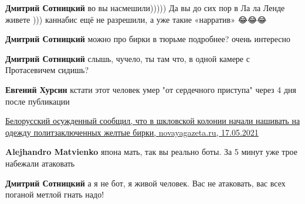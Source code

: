 \begin{itemize}
\begin{itemize}
\textbf{Дмитрий Сотницкий} во вы насмешили))))) Да вы до сих пор в Ла ла Ленде живете ))) каннабис ещё не разрешили, а уже такие «нарратив» 😂😂😂

 

\textbf{Дмитрий Сотницкий} можно про бирки в тюрьме подробнее? очень интересно

 
\textbf{Дмитрий Сотницкий} слышь, чучело, ты там что, в одной камере с Протасевичем сидишь?

 
\textbf{Евгений Хурсин} кстати этот человек умер "от сердечного приступа" через 4 дня после публикации

\href{https://novayagazeta.ru/articles/2021/05/17/belorusskii-osuzhdennyi-soobshchil-chto-v-shklovskoi-kolonii-nachali-nashivat-na-odezhdu-politzakliuchennykh-zheltye-birki}{Белорусский осужденный сообщил, что в шкловской колонии начали нашивать на одежду политзаключенных желтые бирки, novayagazeta.ru, 17.05.2021%
}

 
\textbf{Alejhandro Matvienko} япона мать, так вы реально боты. За 5 минут уже трое набежали атаковать

 
\textbf{Дмитрий Сотницкий} а я не бот, я живой человек. Вас не атаковать, вас всех поганой метлой гнать надо!


\end{itemize}
\end{itemize}
